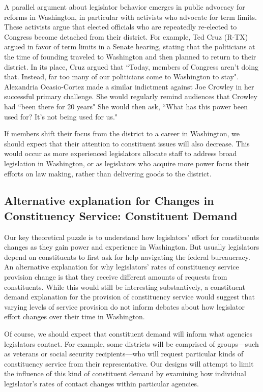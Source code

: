 \documentclass{article}
\begin{document}
A parallel argument about legislator behavior emerges in public advocacy for reforms in Washington, in particular with activists who advocate for term limits.  These activists argue that elected officials who are repeatedly re-elected to Congress become detached from their district.  For example, Ted Cruz (R-TX) argued in favor of term limits in a Senate hearing, stating that the politicians at the time of founding traveled to Washington and then planned to return to their district.  In its place, Cruz argued that ``Today, members of Congress aren't doing that. Instead, far too many of our politicians come to Washington to stay".  Alexandria Ocasio-Cortez made a similar indictment against Joe Crowley in her successful primary challenge.  She would regularly remind audiences that Crowley had ``been there for 20 years" She would then ask, ``What has this power been used for? It's not being used for us."  %

If members shift their focus from the district to a career in Washington, we should expect that their attention to constituent issues will also decrease.  This would occur as more experienced legislators allocate staff to address broad legislation in Washington, or as legislators who acquire more power focus their efforts on law making, rather than delivering goods to the district.   

\subsection{Alternative explanation for Changes in Constituency Service: Constituent Demand}

Our key theoretical puzzle is to understand how legislators' effort for constituents changes as they gain power and experience in Washington. But usually legislators depend on constituents to first ask for help navigating the federal bureaucracy.  An alternative explanation for why legislators' rates of constituency service provision change is that they receive different amounts of requests from constituents.  While this would still be interesting substantively, a constituent demand explanation for the provision of constituency service would suggest that varying levels of service provision do not inform debates about how legislator effort changes over their time in Washington.  

Of course, we should expect that constituent demand will inform what agencies legislators contact.  For example, some districts will be comprised of groups---such as veterans or social security recipients---who will request particular kinds of constituency service from their representative.  Our designs will attempt to limit the influence of this kind of constituent demand by examining how individual legislator's rates of contact changes within particular agencies.  
\end{document}
